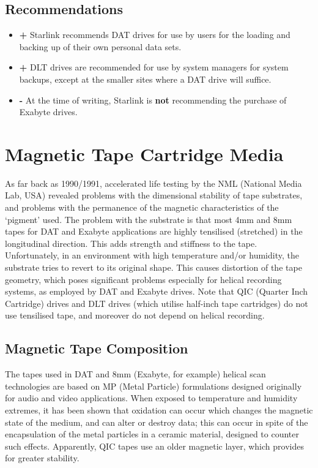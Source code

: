 \documentclass[11pt]{article}
\begin{document}
\subsection {Recommendations}

\begin {itemize}

\item[{\Large\bf +}] Starlink recommends DAT drives for use by users for the
loading and backing up of their own personal data sets.

\item[{\Large\bf +}] DLT drives are recommended for use by system managers for
system backups, except at the smaller sites where a DAT drive will suffice.

\item[{\huge\bf -}] At the time of writing, Starlink is {\bf not} recommending
the purchase of Exabyte drives.

\end {itemize}
\section {Magnetic Tape Cartridge Media}

As far back as 1990/1991, accelerated life testing by the NML (National
Media Lab, USA) revealed problems with the dimensional stability of tape
substrates, and problems with the permanence of the magnetic characteristics
of the `pigment' used. The problem with the substrate is that most 4mm and
8mm tapes for DAT and Exabyte applications are highly tensilised (stretched)
in the longitudinal direction. This adds strength and stiffness to the tape.
Unfortunately, in an environment with high temperature and/or humidity, the
substrate tries to revert to its original shape. This causes distortion of
the tape geometry, which poses significant problems especially for helical
recording systems, as employed by DAT and Exabyte drives. Note that QIC
(Quarter Inch Cartridge) drives and DLT drives (which utilise half-inch
tape cartridges) do not use tensilised tape, and moreover do not depend on
helical recording.

\subsection {Magnetic Tape Composition}

The tapes used in DAT and 8mm (Exabyte, for example) helical scan technologies
are based on MP (Metal Particle) formulations designed originally for audio and
video applications. When exposed to temperature and humidity extremes, it
has been shown that oxidation can occur which changes the magnetic state of the
medium, and can alter or destroy data; this can occur in spite of the
encapsulation of the metal particles in a ceramic material, designed to counter
such effects. Apparently, QIC tapes use an older magnetic layer, which provides
for greater stability.
\end{document}
